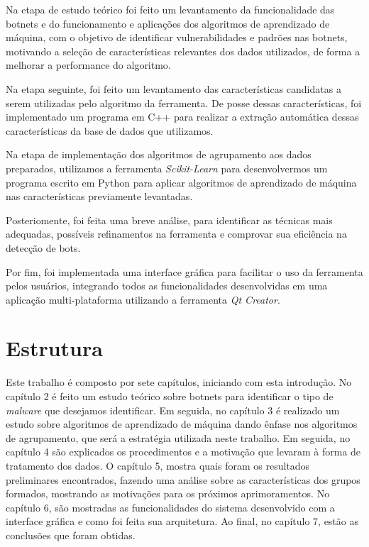 Na etapa de estudo teórico foi feito um levantamento da funcionalidade das botnets e do funcionamento e aplicações dos algoritmos de aprendizado de máquina, com o objetivo de identificar vulnerabilidades e padrões nas botnets, motivando a seleção de características relevantes dos dados utilizados, de forma a melhorar a performance do algoritmo.

Na etapa seguinte, foi feito um levantamento das características candidatas a serem utilizadas pelo algoritmo da ferramenta. De posse dessas características, foi implementado um programa em C++ para realizar a extração automática dessas características da base de dados que utilizamos.

Na etapa de implementação dos algoritmos de agrupamento aos dados preparados, utilizamos a ferramenta \textit{Scikit-Learn} para desenvolvermos um programa escrito em Python para aplicar algoritmos de aprendizado de máquina nas características previamente levantadas.

Posteriomente, foi feita uma breve análise, para identificar as técnicas mais adequadas, possíveis refinamentos na ferramenta e comprovar sua eficiência na detecção de bots.

Por fim, foi implementada uma interface gráfica para facilitar o uso da ferramenta pelos usuários, integrando todos as funcionalidades desenvolvidas em uma aplicação multi-plataforma utilizando a ferramenta \textit{Qt Creator}.

\section{Estrutura}
Este trabalho é composto por sete capítulos, iniciando com esta introdução. No capítulo 2 é feito um estudo teórico sobre botnets para identificar o tipo de \textit{malware} que desejamos identificar. Em seguida, no capítulo 3 é realizado um estudo sobre algoritmos de aprendizado de máquina dando ênfase nos algoritmos de agrupamento, que será a estratégia utilizada neste trabalho. Em seguida, no capítulo 4 são explicados os procedimentos e a motivação que levaram à forma de tratamento dos dados. O capítulo 5, mostra quais foram os resultados preliminares encontrados, fazendo uma análise sobre as características dos grupos formados, mostrando as motivações para os próximos aprimoramentos. No capítulo 6, são mostradas as funcionalidades do sistema desenvolvido com a interface gráfica e como foi feita sua arquitetura. Ao final, no capítulo 7, estão as conclusões que foram obtidas.
